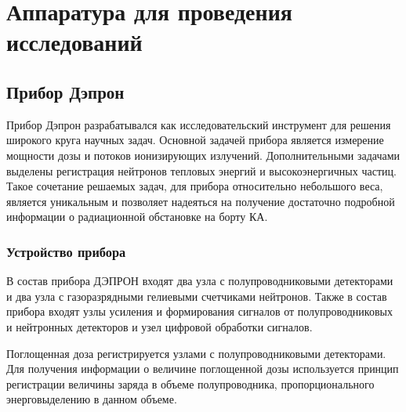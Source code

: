 \chapter{Аппаратура для проведения исследований} \label{chapt2}

\section{Прибор Дэпрон}

Прибор Дэпрон разрабатывался как исследовательский инструмент для решения широкого круга научных задач. Основной задачей прибора является измерение мощности дозы и потоков ионизирующих излучений. Дополнительными задачами выделены регистрация нейтронов тепловых энергий и высокоэнергичных частиц. Такое сочетание решаемых задач, для прибора относительно небольшого веса, является уникальным и позволяет надеяться на получение достаточно подробной информации о радиационной обстановке на борту КА. 

\subsection{Устройство прибора}

В состав прибора ДЭПРОН входят два узла с полупроводниковыми детекторами и два узла с газоразрядными гелиевыми счетчиками нейтронов. Также в состав прибора входят узлы усиления и формирования сигналов от полупроводниковых и нейтронных детекторов и узел цифровой обработки сигналов.


Поглощенная доза регистрируется узлами с полупроводниковыми детекторами. Для получения информации о величине поглощенной дозы используется принцип регистрации величины заряда в объеме полупроводника, пропорционального энерговыделению в данном объеме. 

